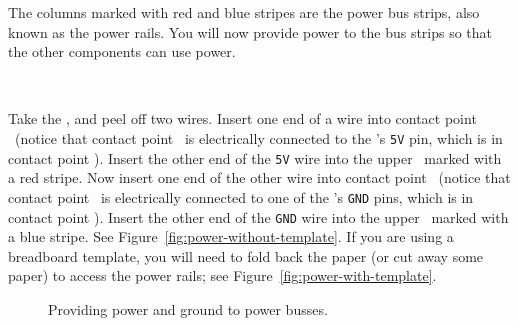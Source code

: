 The columns marked with red and blue stripes are the power bus strips, also known as the power rails.
You will now provide power to the bus strips so that the other components can use power.

\disconnect\

Take the \rainbow, and peel off two wires.
Insert one end of a wire into contact point \mcufivevoltcontactpoint\ (notice that contact point \mcufivevoltcontactpoint\ is electrically connected to the \developmentboard's \texttt{5V} pin, which is in contact point \mcufivevolt).
Insert the other end of the \texttt{5V} wire into the upper \power\ marked with a red stripe.
Now insert one end of the other wire into contact point \mcuuppergroundcontactpoint\ (notice that contact point \mcuuppergroundcontactpoint\ is electrically connected to one of the \developmentboard's \texttt{GND} pins, which is in contact point \mcuupperground).
Insert the other end of the \texttt{GND} wire into the upper \ground\ marked with a blue stripe.
See Figure~\ref{fig:power-without-template}.
If you are using a breadboard template, you will need to fold back the paper (or cut away some paper) to access the power rails;
see Figure~\ref{fig:power-with-template}.

\begin{figure}
    \centering
    \hfil
    \caption{Providing power and ground to power busses.}
\end{figure}

